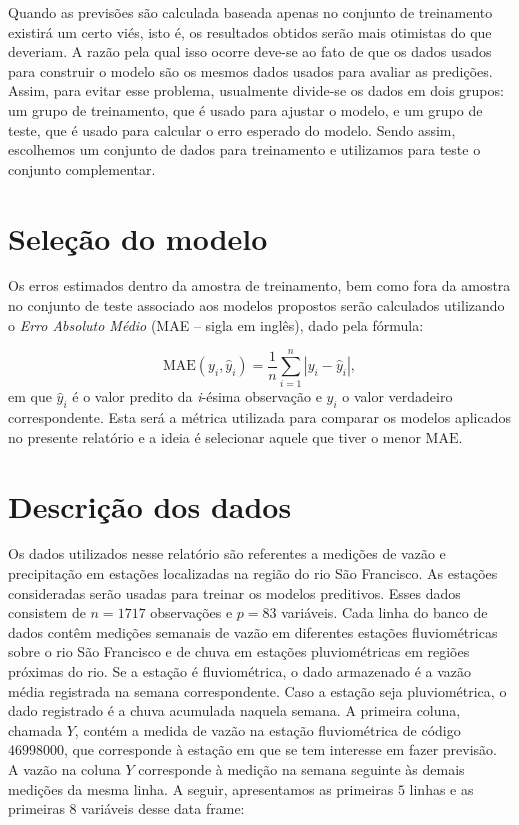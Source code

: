 \documentclass[11pt,]{article}
\begin{document}
Quando as previsões são calculada baseada apenas no conjunto de
treinamento existirá um certo viés, isto é, os resultados obtidos serão
mais otimistas do que deveriam. A razão pela qual isso ocorre deve-se ao
fato de que os dados usados para construir o modelo são os mesmos dados
usados para avaliar as predições. Assim, para evitar esse problema,
usualmente divide-se os dados em dois grupos: um grupo de treinamento,
que é usado para ajustar o modelo, e um grupo de teste, que é usado para
calcular o erro esperado do modelo. Sendo assim, escolhemos um conjunto
de dados para treinamento e utilizamos para teste o conjunto
complementar.

\hypertarget{seleuxe7uxe3o-do-modelo}{%
\section{Seleção do modelo}\label{seleuxe7uxe3o-do-modelo}}

Os erros estimados dentro da amostra de treinamento, bem como fora da
amostra no conjunto de teste associado aos modelos propostos serão
calculados utilizando o \textit{Erro Absoluto Médio} (MAE -- sigla em
inglês), dado pela fórmula:

\begin{equation*}
\mathrm{MAE}(y_i,\widehat{y}_i)=\frac{1}{n}\sum\limits_{i=1}^{n}|y_i-\widehat{y}_i|,
\end{equation*} em que \(\widehat{y}_i\) é o valor predito da
\textit{i}-ésima observação e \(y_i\) o valor verdadeiro correspondente.
Esta será a métrica utilizada para comparar os modelos aplicados no
presente relatório e a ideia é selecionar aquele que tiver o menor
\(\mathrm{MAE}\).

\hypertarget{descriuxe7uxe3o-dos-dados}{%
\section{Descrição dos dados}\label{descriuxe7uxe3o-dos-dados}}

Os dados utilizados nesse relatório são referentes a medições de vazão e
precipitação em estações localizadas na região do rio São Francisco. As
estações consideradas serão usadas para treinar os modelos preditivos.
Esses dados consistem de \(n=1717\) observações e \(p=83\) variáveis.
Cada linha do banco de dados contêm medições semanais de vazão em
diferentes estações fluviométricas sobre o rio São Francisco e de chuva
em estações pluviométricas em regiões próximas do rio. Se a estação é
fluviométrica, o dado armazenado é a vazão média registrada na semana
correspondente. Caso a estação seja pluviométrica, o dado registrado é a
chuva acumulada naquela semana. A primeira coluna, chamada \(Y\), contém
a medida de vazão na estação fluviométrica de código \(46998000\), que
corresponde à estação em que se tem interesse em fazer previsão. A vazão
na coluna \(Y\) corresponde à medição na semana seguinte às demais
medições da mesma linha. A seguir, apresentamos as primeiras \(5\)
linhas e as primeiras \(8\) variáveis desse data frame:
\end{document}
